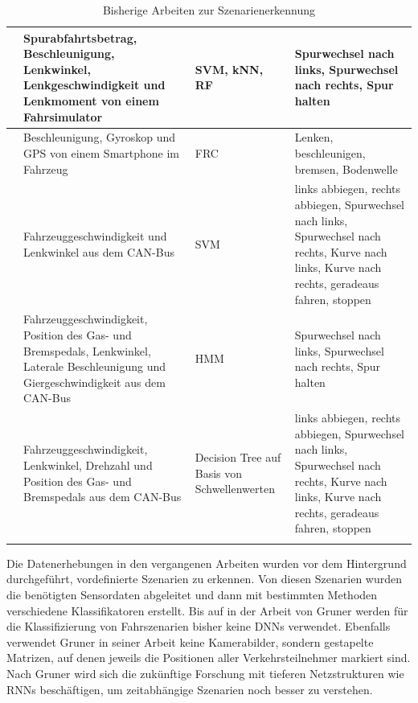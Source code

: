 \begin{longtable}[c]{p{} p{4.5cm} p{} p{4.5cm}}
\cite{zheng2016drivers} & Spurabfahrtsbetrag, Beschleunigung, Lenkwinkel, Lenkgeschwindigkeit und Lenkmoment von einem Fahrsimulator & \ac{SVM}, \ac{kNN}, \ac{RF} & Spurwechsel nach links, Spurwechsel nach rechts, Spur halten \\
\hline

\cite{arroyo2016adaptive} & Beschleunigung, Gyroskop und GPS von einem Smartphone im Fahrzeug & \ac{FRC} & Lenken, beschleunigen, bremsen, Bodenwelle \\
\hline

\cite{zheng2015non} & Fahrzeuggeschwindigkeit und Lenkwinkel aus dem CAN-Bus & \ac{SVM} & links abbiegen, rechts abbiegen, Spurwechsel nach links, Spurwechsel nach rechts, Kurve nach links, Kurve nach rechts, geradeaus fahren, stoppen \\
\hline

\cite{li2015lane} & Fahrzeuggeschwindigkeit, Position des Gas- und Bremspedals, Lenkwinkel, Laterale Beschleunigung und Giergeschwindigkeit aus dem CAN-Bus & \ac{HMM} & Spurwechsel nach links, Spurwechsel nach rechts, Spur halten \\
\hline

\cite{zheng2014threshold} & Fahrzeuggeschwindigkeit, Lenkwinkel, Drehzahl und Position des Gas- und Bremspedals aus dem CAN-Bus & Decision Tree auf Basis von Schwellenwerten & links abbiegen, rechts abbiegen, Spurwechsel nach links, Spurwechsel nach rechts, Kurve nach links, Kurve nach rechts, geradeaus fahren, stoppen \\

\hline
\caption{Bisherige Arbeiten zur Szenarienerkennung}
\label{tab_szenarienerkennung}
\end{longtable}

Die Datenerhebungen in den vergangenen Arbeiten wurden vor dem Hintergrund durchgeführt, vordefinierte Szenarien zu erkennen. Von diesen Szenarien wurden die benötigten Sensordaten abgeleitet und dann mit bestimmten Methoden verschiedene Klassifikatoren erstellt. Bis auf in der Arbeit von Gruner \cite{gruner2017spatiotemporal} werden für die Klassifizierung von Fahrszenarien bisher keine \acp{DNN} verwendet. Ebenfalls verwendet Gruner in seiner Arbeit keine Kamerabilder, sondern gestapelte Matrizen, auf denen jeweils die Positionen aller Verkehrsteilnehmer markiert sind. Nach Gruner \cite{gruner2017spatiotemporal} wird sich die zukünftige Forschung mit tieferen Netzstrukturen wie \acp{RNN} beschäftigen, um zeitabhängige Szenarien noch besser zu verstehen.


